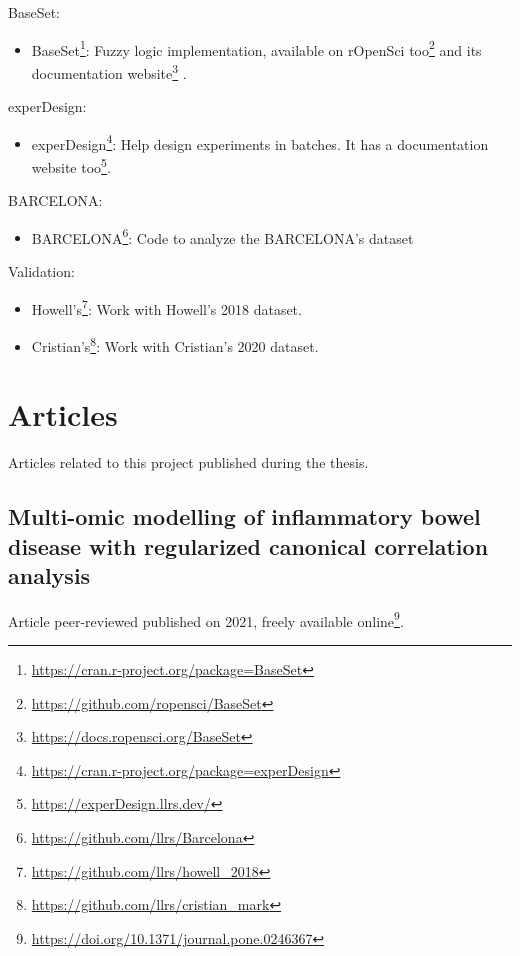 \documentclass[
  12pt,
  a4paper,
  twoside,
  openright]{book}
\DeclareRobustCommand{\href}[2]{#2\footnote{\url{#1}}}
\providecommand{\tightlist}{%
  \setlength{\itemsep}{0pt}\setlength{\parskip}{0pt}}
\begin{document}
BaseSet:

\begin{itemize}
\tightlist
\item
  \href{https://cran.r-project.org/package=BaseSet}{BaseSet}: Fuzzy logic implementation, available on \href{https://github.com/ropensci/BaseSet}{rOpenSci too} and its \href{https://docs.ropensci.org/BaseSet}{documentation website} .
\end{itemize}

experDesign:

\begin{itemize}
\tightlist
\item
  \href{https://cran.r-project.org/package=experDesign}{experDesign}: Help design experiments in batches. It has a \href{https://experDesign.llrs.dev/}{documentation website too}.
\end{itemize}

BARCELONA:

\begin{itemize}
\tightlist
\item
  \href{https://github.com/llrs/Barcelona}{BARCELONA}: Code to analyze the BARCELONA's dataset
\end{itemize}

Validation:

\begin{itemize}
\tightlist
\item
  \href{https://github.com/llrs/howell_2018}{Howell's}: Work with Howell's 2018 dataset.
\item
  \href{https://github.com/llrs/cristian_mark}{Cristian's}: Work with Cristian's 2020 dataset.
\end{itemize}

\hypertarget{articles}{%
\chapter{Articles}\label{articles}}

Articles related to this project published during the thesis.

\hypertarget{app-multiomics}{%
\section{Multi-omic modelling of inflammatory bowel disease with regularized canonical correlation analysis}\label{app-multiomics}}


Article peer-reviewed published on 2021, freely \href{https://doi.org/10.1371/journal.pone.0246367}{available online}.
\end{document}
